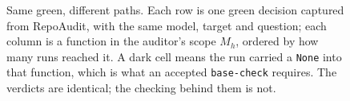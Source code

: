 \begin{figure}[pos=t]
\centering

\caption{Same green, different paths. Each row is one green decision captured from RepoAudit, with the same model, target and question; each column is a function in the auditor's scope $M_h$, ordered by how many runs reached it. A dark cell means the run carried a \texttt{None} into that function, which is what an accepted \texttt{base-check} requires. The verdicts are identical; the checking behind them is not. \PathwaySentence{}}
\label{fig:pathways}
\end{figure}
